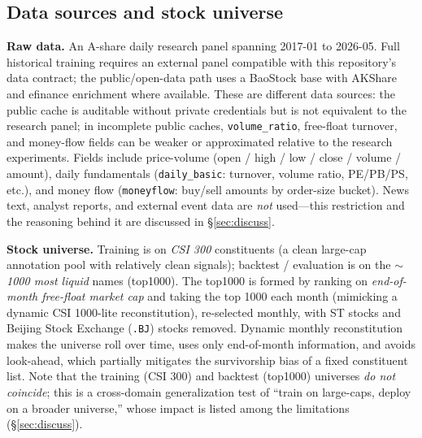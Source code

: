 \documentclass[a4paper,11pt]{article}
\begin{document}
\subsection{Data sources and stock universe}\label{sec:data-universe}
\textbf{Raw data.} An A-share daily research panel spanning 2017-01 to
2026-05. Full historical training requires an external panel compatible with
this repository's data contract; the public/open-data path uses a BaoStock base
with AKShare and efinance enrichment where available. These are different data
sources: the public cache is auditable without private credentials but is not
equivalent to the research panel; in incomplete public caches,
\texttt{volume\_ratio}, free-float turnover, and money-flow fields can be
weaker or approximated relative to the research experiments.
Fields include price-volume (open / high / low / close / volume / amount), daily
fundamentals (\texttt{daily\_basic}: turnover, volume ratio, PE/PB/PS, etc.),
and money flow (\texttt{moneyflow}: buy/sell amounts by order-size bucket).
News text, analyst reports, and external event data are \emph{not} used---this
restriction and the reasoning behind it are discussed in \S\ref{sec:discuss}.

\textbf{Stock universe.} Training is on \emph{CSI 300} constituents (a
clean large-cap annotation pool with relatively clean signals); backtest /
evaluation is on the \emph{$\sim$1000 most liquid} names (top1000). The top1000
is formed by ranking on \emph{end-of-month free-float market cap} and taking
the top 1000 each month (mimicking a dynamic CSI 1000-lite reconstitution),
re-selected monthly, with ST stocks and Beijing Stock Exchange (\texttt{.BJ})
stocks removed. Dynamic monthly reconstitution makes the universe roll over
time, uses only end-of-month information, and avoids look-ahead, which
partially mitigates the survivorship bias of a fixed constituent list. Note
that the training (CSI 300) and backtest (top1000) universes \emph{do not
coincide}; this is a cross-domain generalization test of ``train on large-caps,
deploy on a broader universe,'' whose impact is listed among the limitations
(\S\ref{sec:discuss}).
\end{document}
